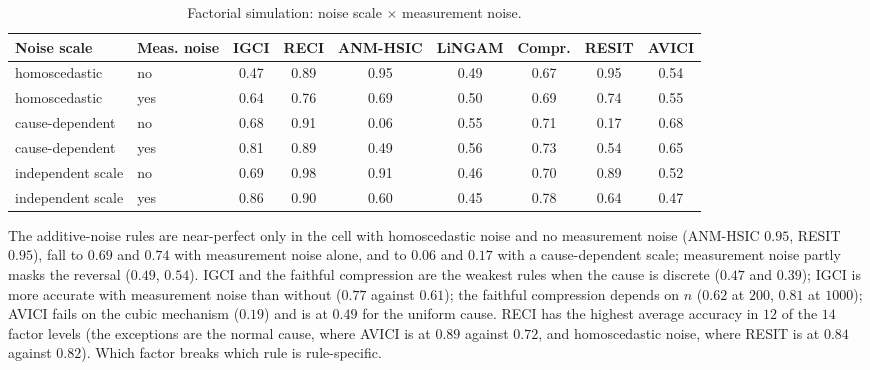 \begin{table}[t]
\caption{Factorial simulation: noise scale $\times$ measurement noise.}
\label{tab:factorial2}
\small
\setlength{\tabcolsep}{3pt}
\begin{tabular}{@{}llccccccc@{}}
\toprule
Noise scale & Meas. noise & IGCI & RECI & ANM-HSIC & LiNGAM & Compr. & RESIT & AVICI\\
\midrule
homoscedastic & no & 0.47 & 0.89 & 0.95 & 0.49 & 0.67 & 0.95 & 0.54\\
homoscedastic & yes & 0.64 & 0.76 & 0.69 & 0.50 & 0.69 & 0.74 & 0.55\\
cause-dependent & no & 0.68 & 0.91 & 0.06 & 0.55 & 0.71 & 0.17 & 0.68\\
cause-dependent & yes & 0.81 & 0.89 & 0.49 & 0.56 & 0.73 & 0.54 & 0.65\\
independent scale & no & 0.69 & 0.98 & 0.91 & 0.46 & 0.70 & 0.89 & 0.52\\
independent scale & yes & 0.86 & 0.90 & 0.60 & 0.45 & 0.78 & 0.64 & 0.47\\
\bottomrule
\end{tabular}
\end{table}

The additive-noise rules are near-perfect only in the cell with homoscedastic noise and no measurement noise (ANM-HSIC $0.95$, RESIT $0.95$), fall to $0.69$ and $0.74$ with measurement noise alone, and to $0.06$ and $0.17$ with a cause-dependent scale; measurement noise partly masks the reversal ($0.49$, $0.54$). IGCI and the faithful compression are the weakest rules when the cause is discrete ($0.47$ and $0.39$); IGCI is more accurate with measurement noise than without ($0.77$ against $0.61$); the faithful compression depends on $n$ ($0.62$ at $200$, $0.81$ at $1000$); AVICI fails on the cubic mechanism ($0.19$) and is at $0.49$ for the uniform cause. RECI has the highest average accuracy in $12$ of the $14$ factor levels (the exceptions are the normal cause, where AVICI is at $0.89$ against $0.72$, and homoscedastic noise, where RESIT is at $0.84$ against $0.82$). Which factor breaks which rule is rule-specific.

